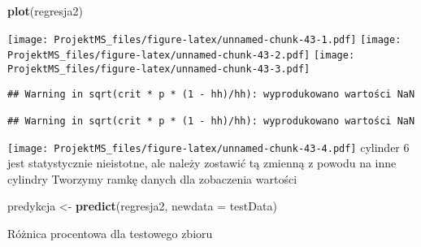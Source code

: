 \documentclass[
]{article}
\newenvironment{Shaded}{\begin{snugshade}}{\end{snugshade}}
\newcommand{\DataTypeTok}[1]{\textcolor[rgb]{0.13,0.29,0.53}{#1}}
\newcommand{\DecValTok}[1]{\textcolor[rgb]{0.00,0.00,0.81}{#1}}
\newcommand{\KeywordTok}[1]{\textcolor[rgb]{0.13,0.29,0.53}{\textbf{#1}}}
\newcommand{\NormalTok}[1]{#1}
\newcommand{\OperatorTok}[1]{\textcolor[rgb]{0.81,0.36,0.00}{\textbf{#1}}}
\newcommand{\StringTok}[1]{\textcolor[rgb]{0.31,0.60,0.02}{#1}}
\begin{document}
\begin{Shaded}
\begin{Highlighting}[]
\KeywordTok{plot}\NormalTok{(regresja2)}
\end{Highlighting}
\end{Shaded}

\texttt{[image: ProjektMS\_files/figure-latex/unnamed-chunk-43-1.pdf]}
\texttt{[image: ProjektMS\_files/figure-latex/unnamed-chunk-43-2.pdf]}
\texttt{[image: ProjektMS\_files/figure-latex/unnamed-chunk-43-3.pdf]}

\begin{verbatim}
## Warning in sqrt(crit * p * (1 - hh)/hh): wyprodukowano wartości NaN

## Warning in sqrt(crit * p * (1 - hh)/hh): wyprodukowano wartości NaN
\end{verbatim}

\texttt{[image: ProjektMS\_files/figure-latex/unnamed-chunk-43-4.pdf]}
cylinder 6 jest statystycznie nieistotne, ale należy zostawić tą zmienną
z powodu na inne cylindry Tworzymy ramkę danych dla zobaczenia wartości

\begin{Shaded}
\begin{Highlighting}[]
\NormalTok{predykcja <-}\StringTok{ }\KeywordTok{predict}\NormalTok{(regresja2, }\DataTypeTok{newdata =}\NormalTok{ testData)}
\end{Highlighting}
\end{Shaded}

Różnica procentowa dla testowego zbioru

\begin{Shaded}
\end{Shaded}
\end{document}
